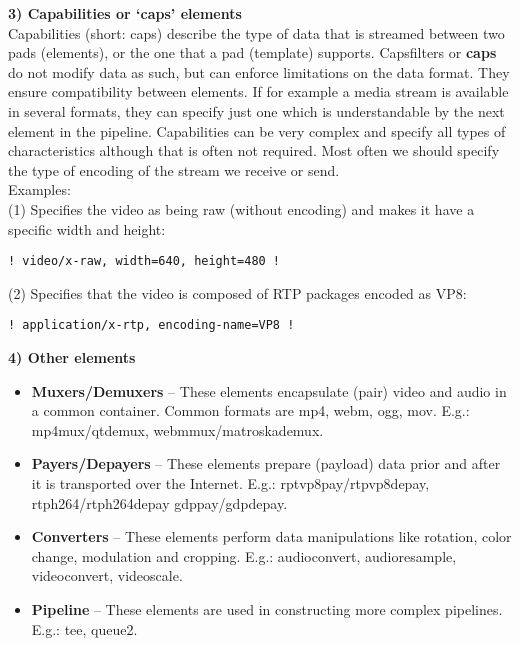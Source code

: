 \textbf{3) Capabilities or ‘caps’ elements}\\
Capabilities (short: caps) describe the type of data that is streamed between two pads (elements), or the one that a pad (template) supports. Capsfilters or \textbf{caps} do not modify data as such, but can enforce limitations on the data format. They ensure compatibility between elements. If for example a media stream is available in several formats, they can specify just one which is understandable by the next element in the pipeline. Capabilities can be very complex and specify all types of characteristics although that is often not required. Most often we should specify the type of encoding of the stream we receive or send.
\\
Examples:
\\
(1) Specifies the video as being raw (without encoding) and makes it have a specific width and height:
\begin{verbatim}
! video/x-raw, width=640, height=480 !
\end{verbatim}
(2) Specifies that the video is composed of RTP packages encoded as VP8:
\begin{verbatim}
! application/x-rtp, encoding-name=VP8 !
\end{verbatim}

\textbf{4) Other elements}\\
\begin{itemize}

\item  \textbf{Muxers/Demuxers} – These elements encapsulate (pair) video and audio in a common container. Common formats are mp4, webm, ogg, mov.
E.g.:  mp4mux/qtdemux, webmmux/matroskademux.

\item    \textbf{Payers/Depayers} – These elements prepare (payload) data prior and after it is transported over the Internet.
E.g.: rptvp8pay/rtpvp8depay,  rtph264/rtph264depay gdppay/gdpdepay.

\item    \textbf{Converters} – These elements perform data manipulations like rotation, color change, modulation and cropping.
E.g.: audioconvert, audioresample, videoconvert, videoscale.

\item    \textbf{Pipeline} – These elements are used in constructing more complex pipelines.
E.g.: tee, queue2.

\end{itemize}

